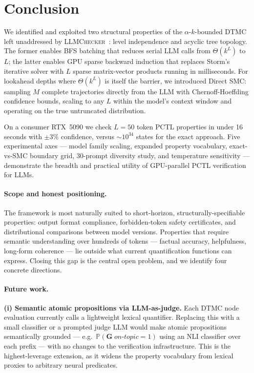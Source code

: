 \documentclass{article}
\newcommand{\Prob}{\mathbb{P}}
\begin{document}
\section{Conclusion}
\label{sec:conclusion}

We identified and exploited two structural properties of the
$\alpha$-$k$-bounded DTMC left unaddressed by
\textsc{LLMChecker}~\citep{gross2025llmchecker}: level independence and acyclic
tree topology.
The former enables BFS batching that reduces serial LLM calls from
$\Theta(k^L)$ to $L$; the latter enables GPU sparse backward induction that
replaces Storm's iterative solver with $L$ sparse matrix-vector products
running in milliseconds.
For lookahead depths where $\Theta(k^L)$ is itself the barrier, we introduced
Direct SMC: sampling $M$ complete trajectories directly from the LLM with
Chernoff-Hoeffding confidence bounds, scaling to any $L$ within the model's
context window and operating on the true untruncated distribution.

On a consumer RTX~5090 we check $L{=}50$ token PCTL properties in under 16
seconds with $\pm3\%$ confidence, versus ${\sim}10^{34}$ states for the exact
approach.
Five experimental axes — model family scaling, expanded property vocabulary,
exact-vs-SMC boundary grid, 30-prompt diversity study, and temperature
sensitivity — demonstrate the breadth and practical utility of GPU-parallel
PCTL verification for LLMs.

\paragraph{Scope and honest positioning.}
The framework is most naturally suited to short-horizon, structurally-specifiable
properties: output format compliance, forbidden-token safety certificates,
and distributional comparisons between model versions.
Properties that require semantic understanding over hundreds of tokens —
factual accuracy, helpfulness, long-form coherence — lie outside what
current quantification functions can express.
Closing this gap is the central open problem, and we identify four concrete
directions.

\paragraph{Future work.}
\textbf{(i) Semantic atomic propositions via LLM-as-judge.}
Each DTMC node evaluation currently calls a lightweight lexical quantifier.
Replacing this with a small classifier or a prompted judge LLM would make
atomic propositions semantically grounded — e.g.\
$\Prob(\mathbf{G}\;\textit{on-topic}{=}1)$ using an NLI classifier over each
prefix — with no changes to the verification infrastructure.
This is the highest-leverage extension, as it widens the property vocabulary
from lexical proxies to arbitrary neural predicates.
\end{document}

